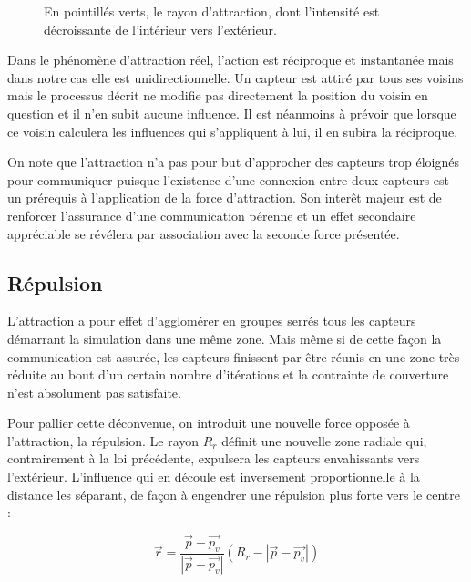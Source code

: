 \documentclass[10pt]{article}
\begin{document}
\begin{multicols}{2}
\begin{figure}[H]

  \centering

  

  \caption{En pointillés verts, le rayon d'attraction, dont
    l'intensité est décroissante de l'intérieur vers l'extérieur.}
  \label{attraction}

\end{figure}

Dans le phénomène d'attraction réel, l'action est réciproque et
instantanée mais dans notre cas elle est unidirectionnelle. Un capteur
est attiré par tous ses voisins mais le processus décrit ne modifie
pas directement la position du voisin en question et il n'en subit
aucune influence. Il est néanmoins à prévoir que lorsque ce voisin
calculera les influences qui s'appliquent à lui, il en subira la
réciproque.

On note que l'attraction n'a pas pour but d'approcher des capteurs
trop éloignés pour communiquer puisque l'existence d'une connexion
entre deux capteurs est un prérequis à l'application de la force
d'attraction. Son interêt majeur est de renforcer l'assurance d'une
communication pérenne et un effet secondaire appréciable se révélera
par association avec la seconde force présentée.

\subsection*{Répulsion}

L'attraction a pour effet d'agglomérer en groupes serrés tous les
capteurs démarrant la simulation dans une même zone. Mais même si de
cette façon la communication est assurée, les capteurs finissent par
être réunis en une zone très réduite au bout d'un certain nombre
d'itérations et la contrainte de couverture n'est absolument pas
satisfaite.

Pour pallier cette déconvenue, on introduit une nouvelle force opposée
à l'attraction, la répulsion. Le rayon $R_r$ définit une nouvelle zone
radiale qui, contrairement à la loi précédente, expulsera les capteurs
envahissants vers l'extérieur. L'influence qui en découle est
inversement proportionnelle à la distance les séparant, de façon à
engendrer une répulsion plus forte vers le centre \cite{Cheng2011497}
:

$$
\vec{r} = \frac{\vec{p} - \vec{p_v}}{|\vec{p} - \vec{p_v}|}(R_r - |\vec{p} - \vec{p_v}|)
$$

\begin{figure}[H]


\end{figure}
\end{multicols}
\end{document}
